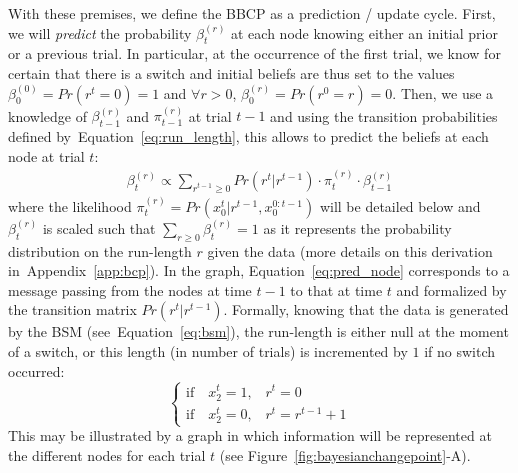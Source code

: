 \documentclass[12pt,english]{article}%
\newcommand{\choice}[1]{ %
	\left\{ %
		\begin{array}{l} #1 \end{array} %
	\right. }
\newcommand{\eql}[1]{\begin{equation}#1\end{equation}}
\newcommand{\eqa}[1]{\begin{align}#1\end{align}}
\newcommand{\Ll}{\mathcal{L}}
\newcommand{\seeFig}[1]{Figure~\ref{fig:#1}}
\newcommand{\seeEq}[1]{Equation~\ref{eq:#1}}
\newcommand{\seeApp}[1]{Appendix~\ref{app:#1}}
\begin{document}
With these premises, we define the BBCP
as a prediction / update cycle.
First, we will \emph{predict} the probability
$\beta^{(r)}_t$ at each node knowing either an initial prior or a previous trial.
In particular, at the occurrence of the first trial, we know for certain that there is a switch and
initial beliefs are thus set to the values $\beta^{(0)}_0=Pr(r^t=0)=1$ and
$\forall r>0$, $\beta^{(r)}_0=Pr(r^0=r)=0$.
Then, we use a knowledge of $\beta^{(r)}_{t-1}$ and  $\pi^{(r)}_{t-1}$ at trial $t-1$ and
using the transition probabilities defined by~\seeEq{run_length},
this allows to predict the beliefs at each node at trial $t$:
\eqa{
\beta^{(r)}_t \propto \sum_{r^{t-1} \geq 0}  Pr(r^t | r^{t-1}) \cdot  \pi^{(r)}_{t} \cdot  \beta^{(r)}_{t-1}
\label{eq:pred_node}
}
where the likelihood $\pi^{(r)}_{t}=Pr(x_0^{t} | r^{t-1}, x_0^{0:t-1})$ will be detailed below
and $\beta^{(r)}_t$ is scaled such that $\sum_{r \geq 0 } \beta^{(r)}_t = 1$
as it represents the probability distribution on the run-length $r$ given the data
(more details on this derivation in~\seeApp{bcp}).
In the graph, \seeEq{pred_node} corresponds to a message passing from the nodes at time $t-1$
to that at time $t$ and formalized by the transition matrix $Pr(r^t | r^{t-1})$.
Formally, knowing that the data is generated by the BSM (see~\seeEq{bsm}),
the run-length is either null at the moment of a switch,
or this length (in number of trials) is incremented by $1$ if no switch occurred:
\eql{\choice{
\text{if} \quad x_2^t=1 \text{,} \quad r^t = 0\\
\text{if} \quad x_2^t=0 \text{,} \quad r^t = r^{t-1} +1 }\label{eq:run_length}}%
This may be illustrated by a graph
in which information will be represented at the different nodes for each trial $t$ (see \seeFig{bayesianchangepoint}-A).
\end{document}
